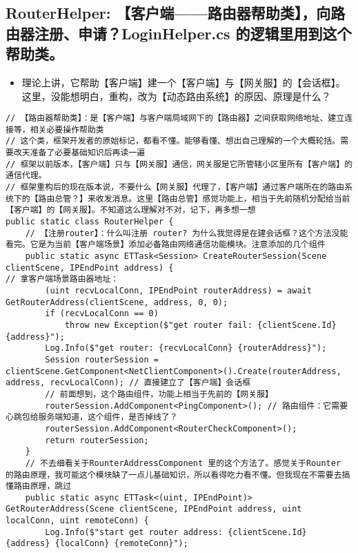 \documentclass[9pt, b5paper]{article}
\begin{document}
\subsection{RouterHelper: 【客户端——路由器帮助类】，向路由器注册、申请？LoginHelper.cs 的逻辑里用到这个帮助类。}
\label{sec-7-5}
\begin{itemize}
\item 理论上讲，它帮助【客户端】建一个【客户端】与【网关服】的【会话框】。这里，没能想明白，重构，改为【动态路由系统】的原因、原理是什么？
\end{itemize}
\begin{verbatim}
// 【路由器帮助类】：是【客户端】与客户端局域网下的【路由器】之间获取网络地址、建立连接等，相关必要操作帮助类
// 这个类，框架开发者的原始标记，都看不懂。能够看懂、想出自己理解的一个大概轮括。需要改天准备了必要基础知识后再读一遍
// 框架以前版本，【客户端】只与【网关服】通信，网关服是它所管辖小区里所有【客户端】的通信代理。
// 框架重构后的现在版本说，不要什么【网关服】代理了，【客户端】通过客户端所在的路由系统下的【路由总管？】来收发消息。这里【路由总管】感觉功能上，相当于先前随机分配给当前【客户端】的【网关服】。不知道这么理解对不对，记下，再多想一想
public static class RouterHelper {
    // 【注册router】：什么叫注册 router? 为什么我觉得是在建会话框？这个方法没能看完。它是为当前【客户端场景】添加必备路由网络通信功能模块。注意添加的几个组件
    public static async ETTask<Session> CreateRouterSession(Scene clientScene, IPEndPoint address) {
// 拿客户端场景路由器地址：
        (uint recvLocalConn, IPEndPoint routerAddress) = await GetRouterAddress(clientScene, address, 0, 0); 
        if (recvLocalConn == 0) 
            throw new Exception($"get router fail: {clientScene.Id} {address}");
        Log.Info($"get router: {recvLocalConn} {routerAddress}");
        Session routerSession = clientScene.GetComponent<NetClientComponent>().Create(routerAddress, address, recvLocalConn); // 直接建立了【客户端】会话框
        // 前面想到，这个路由组件，功能上相当于先前的【网关服】
        routerSession.AddComponent<PingComponent>(); // 路由组件：它需要心跳包给服务端知道，这个组件，是否掉线了？
        routerSession.AddComponent<RouterCheckComponent>(); 
        return routerSession;
    }
    // 不去细看关于RounterAddressComponent 里的这个方法了。感觉关于Rounter 的路由原理，我可能这个模块缺了一点儿基础知识，所以看得吃力看不懂。但我现在不需要去搞懂路由原理，跳过
    public static async ETTask<(uint, IPEndPoint)> GetRouterAddress(Scene clientScene, IPEndPoint address, uint localConn, uint remoteConn) {
        Log.Info($"start get router address: {clientScene.Id} {address} {localConn} {remoteConn}");

\end{verbatim}
\end{document}
